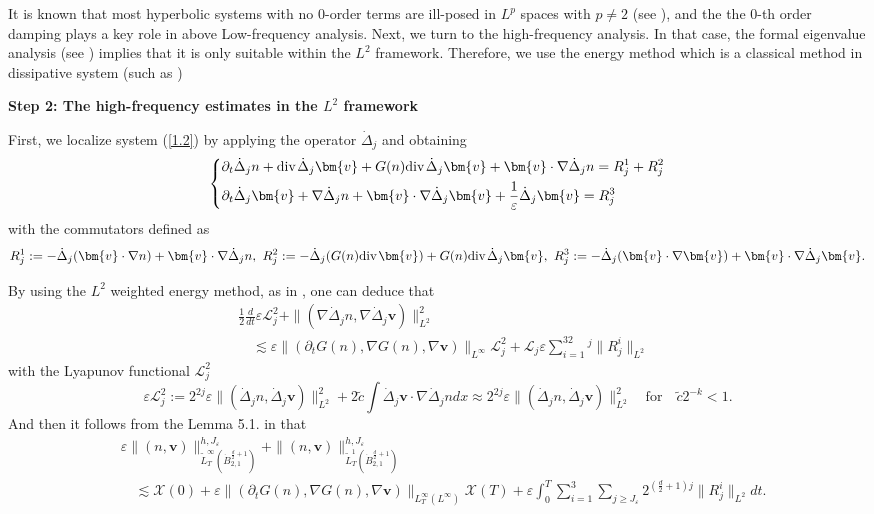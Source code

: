 \documentclass{amsart}
\theoremstyle{definition}
\theoremstyle{remark}
\numberwithin{equation}{section}
\def\d{\partial}
\def\ddj{\dot \Delta_j}
\def\dB{{\dot {B}}}
\renewcommand{\div}{\mbox{\rm div}\;\!}
\def\cX{{\mathcal X}}
\def\tL{\widetilde{L}}
\def\cL{{\mathcal L}}
\def\bv{{\bm{v} }}
\begin{document}
It is known that most hyperbolic systems with no $0$-order terms are ill-posed in $L^p$ spaces with $p\neq2$ (see \cite{Brenner}), and the
the $0$-th order damping plays a key role in above Low-frequency analysis.
Next, we turn to the high-frequency analysis. In that case, the formal eigenvalue analysis (see \cite{BaratDanchin}) implies that it is only suitable within the $L^2$ framework. Therefore, we use the energy method which is a classical method in dissipative system (such as \cite{Zuazua,XuKawaARM14,Li,LiZ})

\vspace{0.5pc}
{\bf Step 2: The high-frequency estimates in the $L^2$ framework}
\vspace{0.5pc}

First, we localize system (\ref{1.2}) by applying the operator $\ddj$ and obtaining
\begin{eqnarray*}
\left\{\aligned
&\d_t \ddj n + \div \ddj\bv + G(n)\div \ddj \bv+ \bv \cdot  \nabla \ddj n  = R_j^1+R_j^2 \\
&\d_t\ddj \bv +\nabla \ddj n+ \bv\cdot \nabla \ddj\bv+\frac{1}{\varepsilon} \ddj \bv= R_j^3
\endaligned\right.
\end{eqnarray*}
with the commutators defined as
\begin{eqnarray*}
\begin{split}
R_j^1:=-\ddj(\bv \cdot  \nabla n)+\bv \cdot  \nabla \ddj n,\
R_j^2:=-\ddj(G(n)\div \bv)+  G(n)\div \ddj \bv,\
R_j^3:=-\ddj(\bv\cdot \nabla\bv)+\bv\cdot \nabla \ddj\bv.
\end{split}
\end{eqnarray*}


By using the $L^2$ weighted energy method, as in \cite{BaratDanchin, XuZhang}, one can deduce that
\begin{equation}\label{dissi4}
\begin{split}
&\frac{1}{2}\frac{d}{dt}\varepsilon\cL_j^2+\|(\nabla\ddj n,\nabla\ddj \bv)\|_{L^2}^2\\
&\quad\lesssim
 \varepsilon\|(\d_tG(n),\nabla G(n), \nabla \bv)\|_{L^\infty}\cL_j^2
  +\cL_j \varepsilon \sum_{i=1}^32^j\|R_j^i\|_{L^2}
\end{split}
\end{equation}
with the Lyapunov functional $\cL_j^2$
$$\varepsilon\cL_j^2:= 2^{2j}\varepsilon\|(\ddj n, \ddj \bv)\|_{L^2}^2+2\tilde{c} \int \ddj \bv \cdot\nabla\ddj n dx
\approx 2^{2j}\varepsilon\|(\ddj n, \ddj \bv)\|_{L^2}^2\quad\mbox{for}\quad \tilde{c}2^{-k}<1.$$
And then it follows from the Lemma 5.1. in \cite{BaratDanchin2} that
\begin{equation}\label{HighEst}
\begin{split}
&\varepsilon\|(n, \bv)\|_{\tL_T^\infty(\dB_{2,1}^{\frac{d}{2}+1})}^{h,J_\varepsilon}
+\|(n, \bv)\|_{\tL_T^1(\dB_{2,1}^{\frac{d}{2}+1})}^{h,J_\varepsilon}\\
&\quad\lesssim
\cX(0)
+\varepsilon \|(\d_t G(n), \nabla G(n), \nabla \bv)\|_{L_T^\infty(L^\infty)}\cX(T)
+\varepsilon\int_0^T \sum_{i=1}^3\sum_{j\geq J_\varepsilon}2^{(\frac{d}{2}+1)j}\|R_j^i\|_{L^2}dt.
\end{split}
\end{equation}
\end{document}
